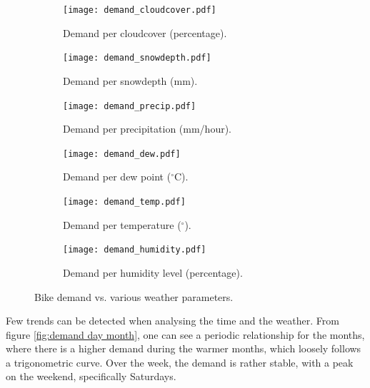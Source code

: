     \begin{figure}[htbp]
        \centering
    
        \begin{subfigure}{0.30\textwidth}
            \centering
            \texttt{[image: demand\_cloudcover.pdf]}
            \caption{Demand per cloudcover (percentage).}
            \label{fig:demand cloudcover}
        \end{subfigure}
        \hfill
        \begin{subfigure}{0.30\textwidth}
            \centering
            \texttt{[image: demand\_snowdepth.pdf]}
            \caption{Demand per snowdepth (mm).}
            \label{fig:demand snowdepth}
        \end{subfigure}
        \hfill
        \begin{subfigure}{0.30\textwidth}
            \centering
            \texttt{[image: demand\_precip.pdf]}
            \caption{Demand per precipitation (mm/hour).}
            \label{fig:demand precip}
        \end{subfigure}
        \hfill
        \begin{subfigure}{0.30\textwidth}
            \centering
            \texttt{[image: demand\_dew.pdf]}
            \caption{Demand per dew point ($^\circ$C).}
            \label{fig:demand dew}
        \end{subfigure}
        \hfill
        \begin{subfigure}{0.30\textwidth}
            \centering
            \texttt{[image: demand\_temp.pdf]}
            \caption{Demand per temperature ($^\circ$).}
            \label{fig:demand temp}
        \end{subfigure}
        \hfill
        \begin{subfigure}{0.30\textwidth}
            \centering
            \texttt{[image: demand\_humidity.pdf]}
            \caption{Demand per humidity level (percentage).} 
            \label{fig:demand humidity}
        \end{subfigure}
            \caption{Bike demand vs. various weather parameters.}
            \label{fig:demand weather}
    \end{figure}

    Few trends can be detected when analysing the time and the weather. From figure \ref{fig:demand day month}, one can see a periodic relationship for the months, where there is a higher demand during the warmer months, which loosely follows a trigonometric curve. Over the week, the demand is rather stable, with a peak on the weekend, specifically Saturdays. 
    
